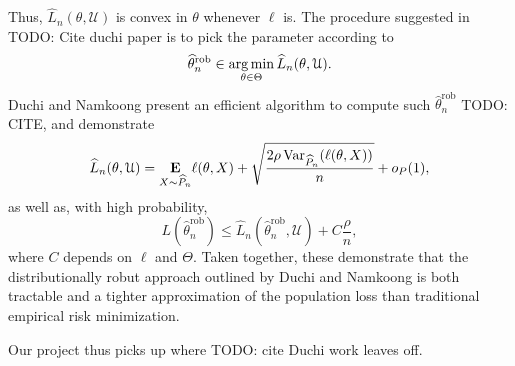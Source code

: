 \documentclass[11pt, reqno, oneside, letterpaper]{article}
\newcommand{\todo}[1]{{\color{red} TODO: {#1}}}
\let\hat\widehat
\begin{document}
Thus, $\hat L_n(\theta, \mathcal{U})$ is convex in $\theta$ whenever $\ell$ is. The procedure suggested in
\todo{Cite duchi paper} is to pick the parameter according to
\[
\hat \theta^{\mathrm{rob}}_{n} \in \argmin_{\theta \in \Theta} \hat L_n(\theta, \mathcal{U}).
\]
Duchi and Namkoong present an efficient algorithm to compute such $\hat \theta^\mathrm{rob}_n$ \todo{CITE},
and demonstrate 
\[
\hat L_n(\theta, \mathcal{U}) = \underset{X \sim \hat P_n}{\E} \ell(\theta, X) +\sqrt{\frac{2\rho \Var_{\hat P_n}(\ell(\theta, X))}{n}} + o_{P}(1),
\]
as well as, with high probability, 
\[
L(\hat \theta^\mathrm{rob}_n) \leq \hat L_n(\hat \theta^\mathrm{rob}_n, \mathcal{U}) + C\frac{\rho}{n},
\]
where $C$ depends on $\ell$ and $\Theta$. Taken together, these demonstrate that the distributionally robut
approach outlined by Duchi and Namkoong is both tractable and a tighter approximation of the population loss
than traditional empirical risk minimization.

Our project thus picks up where \todo{cite Duchi work} leaves off. 
\end{document}
